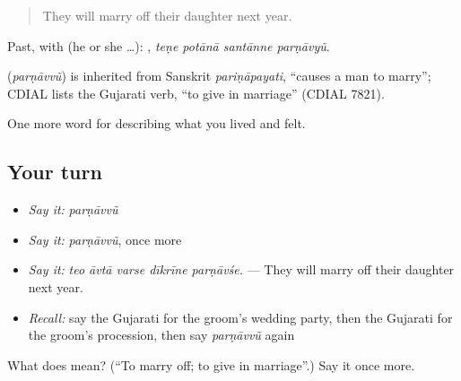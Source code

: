 \begin{quote}
They will marry off their daughter next year.
\end{quote}

Past, with  (he or she …):    , \emph{teṇe potānā santānne parṇāvyũ}.

\begin{cousinweb}
\textbf{} (\emph{parṇāvvũ}) is inherited from Sanskrit \emph{pariṇāpayati}, \textquotedblleft{}causes a man to marry\textquotedblright{}; CDIAL lists the Gujarati verb, \textquotedblleft{}to give in marriage\textquotedblright{} (CDIAL 7821).
\end{cousinweb}

\begin{grammarlens}[title={What you've built}]
One more word for describing what you lived and felt.
\end{grammarlens}

\subsection*{Your turn}
\begin{itemize}
\raggedright
  \item \emph{Say it:} \emph{parṇāvvũ}
  \item \emph{Say it:} \emph{parṇāvvũ}, once more
  \item \emph{Say it:} \emph{teo āvtā varse dīkrīne parṇāvśe.} — They will marry off their daughter next year.
  \item \emph{Recall:} say the Gujarati for the groom's wedding party, then the Gujarati for the groom's procession, then say \emph{parṇāvvũ} again
\end{itemize}

\begin{tcolorbox}[breakable,colback=teal!4,colframe=teal!35!black,title={Before you move on}]
What does  mean? (\textquotedblleft{}To marry off; to give in marriage\textquotedblright{}.) Say it once more.
\end{tcolorbox}
